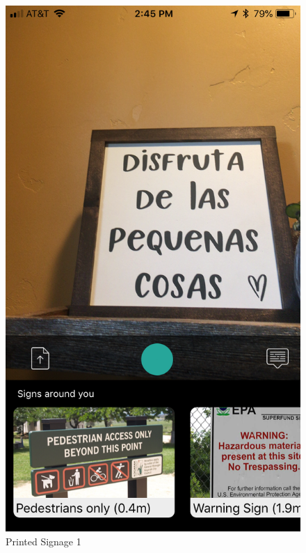 \documentclass[12pt]{article}
\begin{document}
 \begin{figure} [H]
\centering
\begin{minipage}{.5\textwidth}
  \centering
  \includegraphics[width=0.9\linewidth]{media/1.png}
  \caption{Printed Signage 1}
  \label{fig:case3ins}
\end{minipage}%
\begin{minipage}{.5\textwidth}
  \centering

\end{minipage}
\end{figure}
\end{document}
